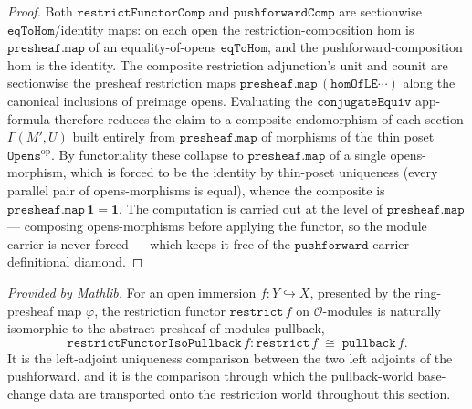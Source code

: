 \begin{proof}
  \leanok
  Both \(\mathtt{restrictFunctorComp}\) and \(\mathtt{pushforwardComp}\) are sectionwise
  \(\mathtt{eqToHom}\)/identity maps: on each open the restriction-composition hom is
  \(\mathtt{presheaf.map}\) of an equality-of-opens \(\mathtt{eqToHom}\), and the
  pushforward-composition hom is the identity. The composite restriction adjunction's unit and
  counit are sectionwise the presheaf restriction maps \(\mathtt{presheaf.map}\,(\mathtt{homOfLE}
  \cdots)\) along the canonical inclusions of preimage opens. Evaluating the
  \(\mathtt{conjugateEquiv}\) app-formula therefore reduces the claim to a composite endomorphism of
  each section \(\Gamma(M', U)\) built entirely from \(\mathtt{presheaf.map}\) of morphisms of the
  thin poset \(\mathtt{Opens}^{\mathrm{op}}\). By functoriality these collapse to
  \(\mathtt{presheaf.map}\) of a single opens-morphism, which is forced to be the identity by
  thin-poset uniqueness (every parallel pair of opens-morphisms is equal), whence the composite is
  \(\mathtt{presheaf.map}\,\mathbf{1} = \mathbf{1}\). The computation is carried out at the level of
  \(\mathtt{presheaf.map}\) — composing opens-morphisms before applying the functor, so the module
  carrier is never forced — which keeps it free of the \(\mathtt{pushforward}\)-carrier
  definitional diamond.
\end{proof}

\begin{definition}
  \label{def:restrictfunctorisopullback}
  \mathlibok
  \textit{Provided by Mathlib.}
  For an open immersion \(f : Y \hookrightarrow X\), presented by the ring-presheaf map
  \(\varphi\), the restriction functor \(\mathtt{restrict}\,f\) on \(\mathcal{O}\)-modules is
  naturally isomorphic to the abstract presheaf-of-modules pullback,
  \[
    \mathtt{restrictFunctorIsoPullback}\,f :
      \mathtt{restrict}\,f \;\cong\; \mathtt{pullback}\,f .
  \]
  It is the left-adjoint uniqueness comparison between the two left adjoints of the
  pushforward, and it is the comparison through which the pullback-world base-change data are
  transported onto the restriction world throughout this section.
\end{definition}

